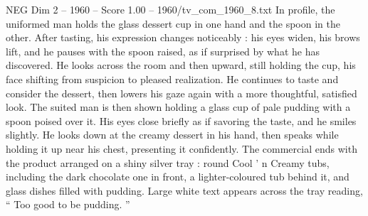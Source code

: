 \begin{textsample}{NEG Dim 2 – 1960 – Score 1.00 – 1960/tv\_com\_1960\_8.txt}
In profile, the uniformed man holds the glass dessert cup in one hand and the spoon in the other.
After tasting, his expression changes noticeably : his eyes widen, his brows lift, and he pauses with the spoon raised, as if surprised by what he has discovered.
He looks across the room and then upward, still holding the cup, his face shifting from suspicion to pleased realization.
He continues to taste and consider the dessert, then lowers his gaze again with a more thoughtful, satisfied look.
The suited man is then shown holding a glass cup of pale pudding with a spoon poised over it.
His eyes close briefly as if savoring the taste, and he smiles slightly.
He looks down at the creamy dessert in his hand, then speaks while holding it up near his chest, presenting it confidently.
The commercial ends with the product arranged on a shiny silver tray : round Cool ’ n Creamy tubs, including the dark chocolate one in front, a lighter-coloured tub behind it, and glass dishes filled with pudding.
Large white text appears across the tray reading, “ Too good to be pudding. ”

\end{textsample}
